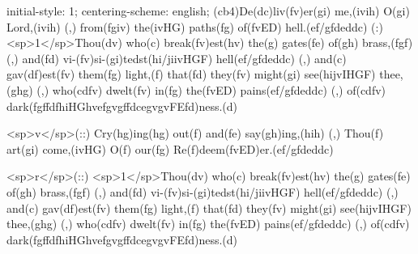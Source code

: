 initial-style: 1;
centering-scheme: english;
(cb4)De(dc)liv(fv)er(gi) me,(ivih) O(gi) Lord,(ivih) (,) from(fgiv) the(ivHG) paths(fg) of(fvED) hell.(ef/gfdeddc) (:) <sp>1</sp>Thou(dv) who(c) break(fv)est(hv) the(g) gates(fe) of(gh) brass,(fgf) (,) and(fd) vi-(fv)si-(gi)tedst(hi/jiivHGF) hell(ef/gfdeddc) (,) and(c) gav(df)est(fv) them(fg) light,(f) that(fd) they(fv) might(gi) see(hijvIHGF) thee,(ghg) (,) who(cdfv) dwelt(fv) in(fg) the(fvED) pains(ef/gfdeddc) (,) of(cdfv) dark(fgffdfhiHGhvefgvgffdcegvgvFEfd)ness.(d)

<sp>v</sp>(::) Cry(hg)ing(hg) out(f) and(fe) say(gh)ing,(hih) (,) Thou(f) art(gi) come,(ivHG) O(f) our(fg) Re(f)deem(fvED)er.(ef/gfdeddc)

<sp>r</sp>(::) <sp>1</sp>Thou(dv) who(c) break(fv)est(hv) the(g) gates(fe) of(gh) brass,(fgf) (,) and(fd) vi-(fv)si-(gi)tedst(hi/jiivHGF) hell(ef/gfdeddc) (,) and(c) gav(df)est(fv) them(fg) light,(f) that(fd) they(fv) might(gi) see(hijvIHGF) thee,(ghg) (,) who(cdfv) dwelt(fv) in(fg) the(fvED) pains(ef/gfdeddc) (,) of(cdfv) dark(fgffdfhiHGhvefgvgffdcegvgvFEfd)ness.(d)